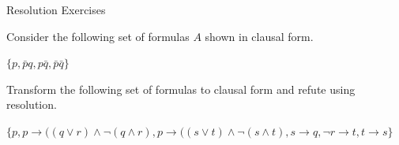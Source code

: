 \documentclass[addpoints]{exam}
\begin{document}
\noindent


\begin{center}
{\LARGE	Resolution Exercises}
\end{center}

\vspace{1cm}

\begin{questions}
	
\question 
Consider the following set of formulas $A$ shown in clausal form.

 $\{p, \bar{p}q, p\bar{q}, \bar{p}\bar{q} \}$ \\
 

\vspace{3cm}	
	
\question Transform the following set of formulas to clausal form and refute using resolution.

$\{p, p \rightarrow ((q \lor r) \land \lnot (q \land r), p \rightarrow ((s \lor t) \land \lnot (s \land t), s \rightarrow q, \lnot r \rightarrow t, t\rightarrow s \}$ 








\end{questions}
\end{document}
